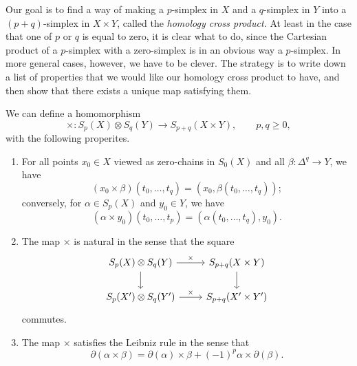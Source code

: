 \documentclass[main.tex]{subfiles}
\begin{document}
Our goal is to find a way of making a $p$-simplex in $X$ and a $q$-simplex in $Y$ into a $(p+q)$-simplex in $X \times Y$, called the \emph{homology cross product.} At least in the case that one of $p$ or $q$ is equal to zero, it is clear what to do, since the Cartesian product of a $p$-simplex with a zero-simplex is in an obvious way a $p$-simplex. In more general cases, however, we have to be clever. The strategy is to write down a list of properties that we would like our homology cross product to have, and then show that there exists a unique map satisfying them.

\begin{lemma}
  \label{lemma:existence_of_homology_cross_product}
  We can define a homomorphism
  \begin{equation*}
    \times\colon S_{p}(X) \otimes S_{q}(Y) \to S_{p+q}(X \times Y), \qquad p,q \geq 0,
  \end{equation*}
  with the following properites.
  \begin{enumerate}
    \item For all points $x_{0} \in X$ viewed as zero-chains in $S_{0}(X)$ and all $\beta\colon \Delta^{q} \to Y$, we have
      \begin{equation*}
        (x_{0} \times \beta)(t_{0}, \ldots, t_{q}) = (x_{0}, \beta(t_{0}, \ldots, t_{q}));
      \end{equation*}
      conversely, for $\alpha \in S_{p}(X)$ and $y_{0} \in Y$, we have
      \begin{equation*}
        (\alpha \times y_{0})(t_{0}, \ldots, t_{p}) = (\alpha(t_{0}, \ldots, t_{q}), y_{0}).
      \end{equation*}

    \item The map $\times$ is natural in the sense that the square
      \begin{equation*}
        \begin{tikzcd}
          S_{p}(X) \otimes S_{q}(Y)
          \arrow[r, "\times"]
          \arrow[d]
          & S_{p+q}(X \times Y)
          \arrow[d]
          \\
          S_{p}(X') \otimes S_{q}(Y')
          \arrow[r, "\times"]
          & S_{p+q}(X' \times Y')
        \end{tikzcd}
      \end{equation*}
      commutes.

    \item The map $\times$ satisfies the Leibniz rule in the sense that
      \begin{equation*}
        \partial(\alpha \times \beta) = \partial(\alpha) \times \beta + (-1)^{p} \alpha \times \partial(\beta).
      \end{equation*}
  \end{enumerate}
\end{lemma}
\end{document}
